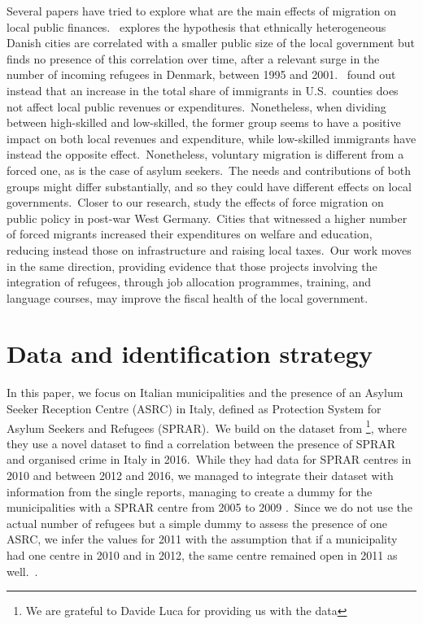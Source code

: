 \documentclass[authoryear,preprint,review,12pt]{elsarticle}
\begin{document}
\noindent
Several papers have tried to explore what are the main effects of migration on local public finances.\ \cite{gerdes2011} explores the hypothesis that ethnically heterogeneous Danish cities are correlated with a smaller public size of the local government but finds no presence of this correlation over time, after a relevant surge in the number of incoming refugees in Denmark, between 1995 and 2001.\ \cite{senses2022} found out instead that an increase in the total share of immigrants in U.S.\ counties does not affect local public revenues or expenditures.\ Nonetheless, when dividing between high-skilled and low-skilled, the former group seems to have a positive impact on both local revenues and expenditure, while low-skilled immigrants have instead the opposite effect.\ Nonetheless, voluntary migration is different from a forced one, as is the case of asylum seekers.\ The needs and contributions of both groups might differ substantially, and so they could have different effects on local governments.\ Closer to our research, \cite{chevalier2023} study the effects of force migration on public policy in post-war West Germany.\ Cities that witnessed a higher number of forced migrants increased their expenditures on welfare and education, reducing instead those on infrastructure and raising local taxes.\ Our work moves in the same direction, providing evidence that those projects involving the integration of refugees, through job allocation programmes, training, and language courses, may improve the fiscal health of the local government.\ 


\vspace{5}

\section{Data and identification strategy}
\noindent
In this paper, we focus on Italian municipalities and the presence of an Asylum Seeker Reception Centre (ASRC) in Italy, defined as Protection System for Asylum Seekers and Refugees (SPRAR).\ We build on the dataset from \cite{proietti2022} \footnote{We are grateful to Davide Luca for providing us with the data}, where they use a novel dataset to find a correlation between the presence of SPRAR and organised crime in Italy in 2016.\ While they had data for SPRAR centres in 2010 and between 2012 and 2016, we managed to integrate their dataset with information from the single reports, managing to create a dummy for the municipalities with a SPRAR centre from 2005 to 2009 \citep{cittalia2022}.\ Since we do not use the actual number of refugees but a simple dummy to assess the presence of one ASRC, we infer the values for 2011 with the assumption that if a municipality had one centre in 2010 and in 2012, the same centre remained open in 2011 as well.\ \citep{cittalia2022}.\\ 
\end{document}
